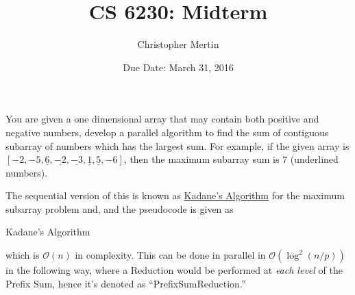 \documentclass[addpoints]{exam}
\title{CS 6230: Midterm}
\date{Due Date: March 31, 2016}
\author{Christopher Mertin}
\newcommand{\BigO}[1]{\mathcal{O}\left( #1\right)}
\begin{document}
\maketitle

\pointname{}
\bonuspointname{}
\pointformat{[\bfseries\thepoints]}

\printanswers



\begin{questions}

You are given a one dimensional array that may contain both positive and negative numbers, develop a parallel algorithm to find the sum of contiguous subarray of numbers which has the largest sum. For example, if the given array is $[-2,-5,\underline{6},\underline{-2},\underline{-3},\underline{1},\underline{5},-6]$, then the maximum subarray sum is $7$ (underlined numbers).

\begin{solution}
The sequential version of this is known as \href{https://en.wikipedia.org/wiki/Maximum_subarray_problem}{Kadane's Algorithm} for the maximum subarray problem and, and the pseudocode is given as

\begin{algorithm}[H]
\caption{Kadane's Algorithm}
\begin{algorithmic}[1]
    \ENDIF
    \ENDIF
\ENDFOR
{}
\end{algorithmic}
\end{algorithm}

which is $\BigO{n}$ in complexity. This can be done in parallel in $\BigO{\log^{2}(n/p)}$ in the following way, where a Reduction would be performed at {\em each level} of the Prefix Sum, hence it's denoted as ``PrefixSumReduction.''


\end{solution}
\end{questions}
\end{document}
